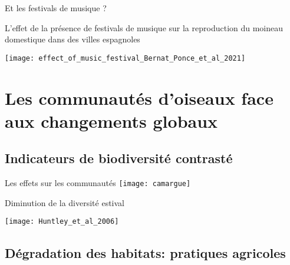 \documentclass[10pt]{beamer}
\begin{document}
\begin{frame}{Et les festivals de musique ?}

  L'effet de la présence de festivals de musique sur la reproduction du moineau
  domestique dans des villes espagnoles
     \begin{center}
     \texttt{[image: effect\_of\_music\_festival\_Bernat\_Ponce\_et\_al\_2021]}
   
      \end{center}
       \begin{tiny}
      \vspace{10pt}
        \cite{BernatPonce2021}

  \end{tiny}
  
\end{frame}

 \section[Les effets sur les communautés]{Les communautés d'oiseaux face aux changements globaux}


\subsection{Indicateurs de biodiversité contrasté}

\begin{frame} {Les effets sur les communautés}
 \texttt{[image: camargue]}
\end{frame}


\begin{frame}{Diminution de la diversité estival}
  \begin{center}
   \texttt{[image: Huntley\_et\_al\_2006]}
  \end{center}
  \begin{tiny}
   \cite{Huntley2006}
  \end{tiny}

\end{frame}



\subsection{Dégradation des habitats: pratiques agricoles}
\end{document}
